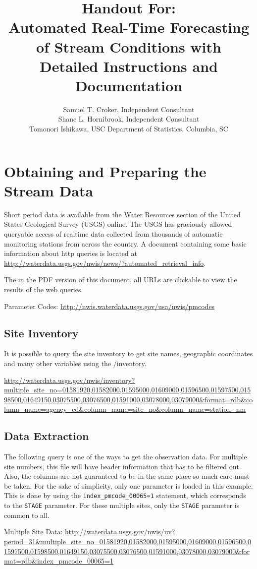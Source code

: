 \documentclass[10pt]{sugconf-ish}
\title{ Handout For:\\Automated Real-Time Forecasting of Stream Conditions with \SASregistered\\Detailed Instructions and Documentation}
\author{Samuel T. Croker,  Independent Consultant\\
Shane L. Hornibrook,  Independent Consultant \\
Tomonori Ishikawa, USC Department of Statistics, Columbia, SC}
\begin{document}
\tableofcontents

\section{Obtaining and Preparing the Stream Data}
Short period data is available from the Water Resources section of the United States Geological Survey (USGS) online.  The USGS has graciously allowed queryable access of realtime data collected from thousands of automatic monitoring stations from across the country.  A document containing some basic information about http queries is located at \\ \url{http://waterdata.usgs.gov/nwis/news/?automated_retrieval_info}.
	
The in the PDF version of this document, all URLs are clickable to view the results of the web queries.

Parameter Codes: \url{http://nwis.waterdata.usgs.gov/usa/nwis/pmcodes}

\subsection{Site Inventory}
It is possible to query the site inventory to get site names, geographic coordinates and many other variables using the /inventory.

\url{http://waterdata.usgs.gov/nwis/inventory?multiple_site_no=01581920,01582000,01595000,01609000,01596500,01597500,01598500,01649150,03075500,03076500,01591000,03078000,03079000&format=rdb&column_name=agency_cd&column_name=site_no&column_name=station_nm} 

\subsection{Data Extraction}
The following query is one of the ways to get the observation data.  For multiple site numbers, this file will have header information that has to be filtered out.  Also, the columns are not guaranteed to be in the same place so much care must be taken.  For the sake of simplicity, only one parameter is loaded in this example. This is done by using the \texttt{index\_pmcode\_00065=1} statement, which corresponds to the \texttt{STAGE} parameter.  For these multiple sites, only the \texttt{STAGE} parameter is common to all. 

Multiple Site Data: \url{http://waterdata.usgs.gov/nwis/uv?period=31&multiple_site_no=01581920,01582000,01595000,01609000,01596500,01597500,01598500,01649150,03075500,03076500,01591000,03078000,03079000&format=rdb&index_pmcode_00065=1}
\end{document}
